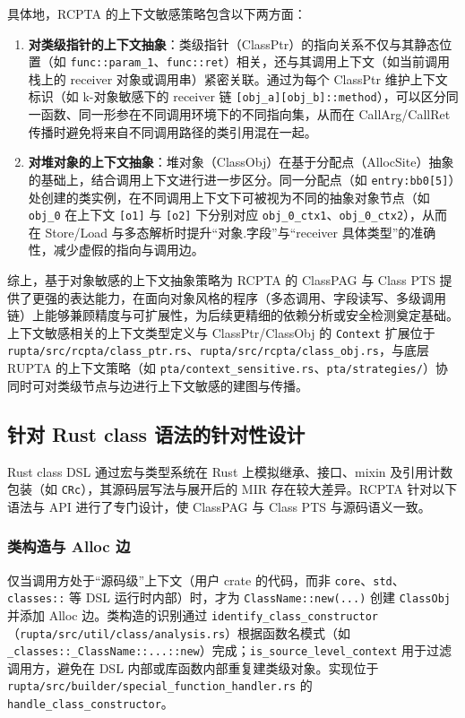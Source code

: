 具体地，RCPTA 的上下文敏感策略包含以下两方面：

\begin{enumerate}
    \item \textbf{对类级指针的上下文抽象}：类级指针（ClassPtr）的指向关系不仅与其静态位置（如 \texttt{func::param\_1}、\texttt{func::ret}）相关，还与其调用上下文（如当前调用栈上的 receiver 对象或调用串）紧密关联。通过为每个 ClassPtr 维护上下文标识（如 k-对象敏感下的 receiver 链 \texttt{[obj\_a][obj\_b]::method}），可以区分同一函数、同一形参在不同调用环境下的不同指向集，从而在 CallArg/CallRet 传播时避免将来自不同调用路径的类引用混在一起。
    
    \item \textbf{对堆对象的上下文抽象}：堆对象（ClassObj）在基于分配点（AllocSite）抽象的基础上，结合调用上下文进行进一步区分。同一分配点（如 \texttt{entry:bb0[5]}）处创建的类实例，在不同调用上下文下可被视为不同的抽象对象节点（如 \texttt{obj\_0} 在上下文 \texttt{[o1]} 与 \texttt{[o2]} 下分别对应 \texttt{obj\_0\_ctx1}、\texttt{obj\_0\_ctx2}），从而在 Store/Load 与多态解析时提升“对象.字段”与“receiver 具体类型”的准确性，减少虚假的指向与调用边。
\end{enumerate}

综上，基于对象敏感的上下文抽象策略为 RCPTA 的 ClassPAG 与 Class PTS 提供了更强的表达能力，在面向对象风格的程序（多态调用、字段读写、多级调用链）上能够兼顾精度与可扩展性，为后续更精细的依赖分析或安全检测奠定基础。上下文敏感相关的上下文类型定义与 ClassPtr/ClassObj 的 \texttt{Context} 扩展位于 \texttt{rupta/src/rcpta/class\_ptr.rs}、\texttt{rupta/src/rcpta/class\_obj.rs}，与底层 RUPTA 的上下文策略（如 \texttt{pta/context\_sensitive.rs}、\texttt{pta/strategies/}）协同时可对类级节点与边进行上下文敏感的建图与传播。

\subsection{针对 Rust class 语法的针对性设计}

Rust class DSL 通过宏与类型系统在 Rust 上模拟继承、接口、mixin 及引用计数包装（如 \texttt{CRc}），其源码层写法与展开后的 MIR 存在较大差异。RCPTA 针对以下语法与 API 进行了专门设计，使 ClassPAG 与 Class PTS 与源码语义一致。

\subsubsection{类构造与 Alloc 边}

仅当调用方处于“源码级”上下文（用户 crate 的代码，而非 \texttt{core}、\texttt{std}、\texttt{classes::} 等 DSL 运行时内部）时，才为 \texttt{ClassName::new(...)} 创建 \texttt{ClassObj} 并添加 Alloc 边。类构造的识别通过 \texttt{identify\_class\_constructor}（\texttt{rupta/src/util/class/analysis.rs}）根据函数名模式（如 \texttt{\_classes::\_ClassName::...::new}）完成；\texttt{is\_source\_level\_context} 用于过滤调用方，避免在 DSL 内部或库函数内部重复建类级对象。实现位于 \texttt{rupta/src/builder/special\_function\_handler.rs} 的 \texttt{handle\_class\_constructor}。

